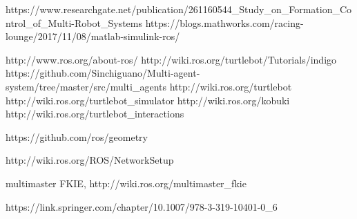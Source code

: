 \documentclass[journal]{IEEEtran}
\begin{document}
\begin{thebibliography}{1}

https://www.researchgate.net/publication/261160544{\_}Study{\_}on{\_}Formation{\_}Control{\_}of{\_}Multi-Robot{\_}Systems
https://blogs.mathworks.com/racing-lounge/2017/11/08/matlab-simulink-ros/

http://www.ros.org/about-ros/
http://wiki.ros.org/turtlebot/Tutorials/indigo
https://github.com/Sinchiguano/Multi-agent-system/tree/master/src/multi{\_}agents
http://wiki.ros.org/turtlebot
http://wiki.ros.org/turtlebot{\_}simulator
http://wiki.ros.org/kobuki
http://wiki.ros.org/turtlebot{\_}interactions

https://github.com/ros/geometry

http://wiki.ros.org/ROS/NetworkSetup



multimaster FKIE, http://wiki.ros.org/multimaster{\_}fkie

https://link.springer.com/chapter/10.1007/978-3-319-10401-0{\_}6

\end{thebibliography}
\end{document}
